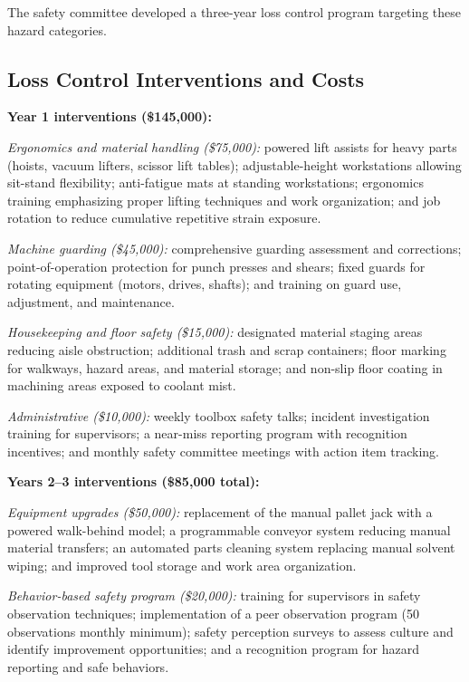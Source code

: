 \documentclass[11pt,openany]{book}
\begin{document}
The safety committee developed a three-year loss control program targeting
these hazard categories.

\subsection{Loss Control Interventions and Costs}

\textbf{Year 1 interventions (\$145{,}000):}

\emph{Ergonomics and material handling (\$75{,}000):} powered lift assists for
heavy parts (hoists, vacuum lifters, scissor lift tables); adjustable-height
workstations allowing sit-stand flexibility; anti-fatigue mats at standing
workstations; ergonomics training emphasizing proper lifting techniques and
work organization; and job rotation to reduce cumulative repetitive strain
exposure.

\emph{Machine guarding (\$45{,}000):} comprehensive guarding assessment and
corrections; point-of-operation protection for punch presses and shears; fixed
guards for rotating equipment (motors, drives, shafts); and training on guard
use, adjustment, and maintenance.

\emph{Housekeeping and floor safety (\$15{,}000):} designated material staging
areas reducing aisle obstruction; additional trash and scrap containers; floor
marking for walkways, hazard areas, and material storage; and non-slip floor
coating in machining areas exposed to coolant mist.

\emph{Administrative (\$10{,}000):} weekly toolbox safety talks; incident
investigation training for supervisors; a near-miss reporting program with
recognition incentives; and monthly safety committee meetings with action item
tracking.

\textbf{Years 2--3 interventions (\$85{,}000 total):}

\emph{Equipment upgrades (\$50{,}000):} replacement of the manual pallet jack
with a powered walk-behind model; a programmable conveyor system reducing
manual material transfers; an automated parts cleaning system replacing manual
solvent wiping; and improved tool storage and work area organization.

\emph{Behavior-based safety program (\$20{,}000):} training for supervisors in
safety observation techniques; implementation of a peer observation program
(50 observations monthly minimum); safety perception surveys to assess culture
and identify improvement opportunities; and a recognition program for hazard
reporting and safe behaviors.
\end{document}
